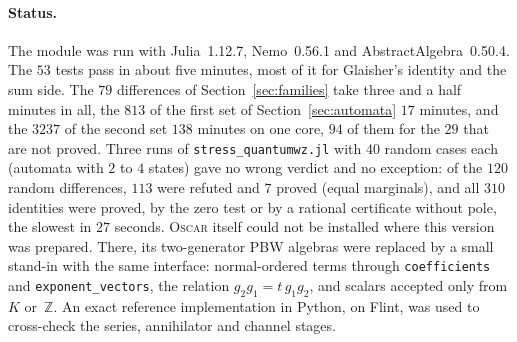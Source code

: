 \documentclass[11pt,a4paper]{article}
\theoremstyle{plain}
\theoremstyle{definition}
\theoremstyle{remark}
\begin{document}
\paragraph{Status.} The module was run with Julia~1.12.7, Nemo~0.56.1 and
AbstractAlgebra~0.50.4. The $53$ tests pass in about five minutes, most of it
for Glaisher's identity and the sum side. The $79$ differences of
Section~\ref{sec:families} take three and a half minutes in all, the $813$ of the
first set of Section~\ref{sec:automata} $17$ minutes, and the $3237$ of the
second set $138$ minutes on one core, $94$ of them for the $29$ that are not
proved. Three runs of \texttt{stress\_quantumwz.jl} with $40$ random cases
each (automata with $2$ to $4$ states) gave no wrong verdict and no exception:
of the $120$ random differences, $113$ were refuted and $7$ proved (equal
marginals), and all $310$ identities were proved, by the zero test or by a
rational certificate without pole, the slowest in $27$ seconds.
\textsc{Oscar} itself could not be installed where this version was prepared.
There, its two-generator PBW algebras were replaced by a small stand-in with
the same interface: normal-ordered terms through \texttt{coefficients} and
\texttt{exponent\_vectors}, the relation $g_2g_1=t\,g_1g_2$, and scalars
accepted only from $K$ or~$\mathbb Z$. An exact reference implementation in
Python, on Flint, was used to cross-check the series, annihilator and channel
stages.

\fussy
\end{document}
